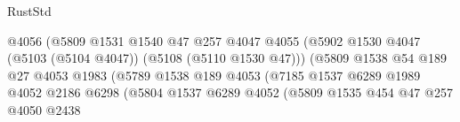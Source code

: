 \begin{lexlean}{RustStd}
\begin{coremodule}
                                                  @4056
                                                  (@5809
                                                    @1531
                                                    @1540
                                                    @47
                                                    @257
                                                    @4047
                                                    @4055
                                                    (@5902
                                                      @1530
                                                      @4047
                                                      (@5103 (@5104 @4047))
                                                      (@5108 (@5110 @1530 @47)))
                                                    (@5809
                                                      @1538
                                                      @54
                                                      @189
                                                      @27
                                                      @4053
                                                      @1983
                                                      (@5789
                                                        @1538
                                                        @189
                                                        @4053
                                                        (@7185
                                                          @1537
                                                          @6289
                                                          @1989
                                                          @4052
                                                          @2186
                                                          @6298
                                                          (@5804
                                                            @1537
                                                            @6289
                                                            @4052
                                                            (@5809
                                                              @1535
                                                              @454
                                                              @47
                                                              @257
                                                              @4050
                                                              @2438

\end{coremodule}
\end{lexlean}
